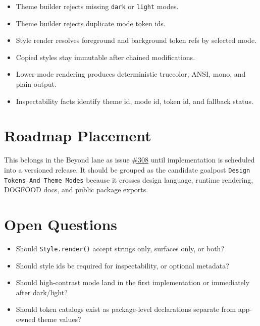 \begin{itemize}
\tightlist
\item
  Theme builder rejects missing \texttt{d\allowbreak{}a\allowbreak{}r\allowbreak{}k} or \texttt{l\allowbreak{}i\allowbreak{}g\allowbreak{}h\allowbreak{}t} modes.
\item
  Theme builder rejects duplicate mode token ids.
\item
  Style render resolves foreground and background token refs by selected mode.
\item
  Copied styles stay immutable after chained modifications.
\item
  Lower-mode rendering produces deterministic truecolor, ANSI, mono, and plain output.
\item
  Inspectability facts identify theme id, mode id, token id, and fallback status.
\end{itemize}

\section{Roadmap Placement}\label{record-178-roadmap-placement}

This belongs in the Beyond lane as issue \href{https://github.com/flyingrobots/bijou/issues/308}{\#308} until implementation is scheduled into a versioned release. It should be grouped as the candidate goalpost \texttt{D\allowbreak{}e\allowbreak{}s\allowbreak{}i\allowbreak{}g\allowbreak{}n\allowbreak{} \allowbreak{}T\allowbreak{}o\allowbreak{}k\allowbreak{}e\allowbreak{}n\allowbreak{}s\allowbreak{} \allowbreak{}A\allowbreak{}n\allowbreak{}d\allowbreak{} \allowbreak{}T\allowbreak{}h\allowbreak{}e\allowbreak{}m\allowbreak{}e\allowbreak{} \allowbreak{}M\allowbreak{}o\allowbreak{}d\allowbreak{}e\allowbreak{}s} because it crosses design language, runtime rendering, DOGFOOD docs, and public package exports.

\section{Open Questions}\label{record-178-open-questions}

\begin{itemize}
\tightlist
\item
  Should \texttt{S\allowbreak{}t\allowbreak{}y\allowbreak{}l\allowbreak{}e\allowbreak{}.\allowbreak{}r\allowbreak{}e\allowbreak{}n\allowbreak{}d\allowbreak{}e\allowbreak{}r\allowbreak{}(\allowbreak{})} accept strings only, surfaces only, or both?
\item
  Should style ids be required for inspectability, or optional metadata?
\item
  Should high-contrast mode land in the first implementation or immediately after dark/light?
\item
  Should token catalogs exist as package-level declarations separate from app-owned theme values?
\end{itemize}

